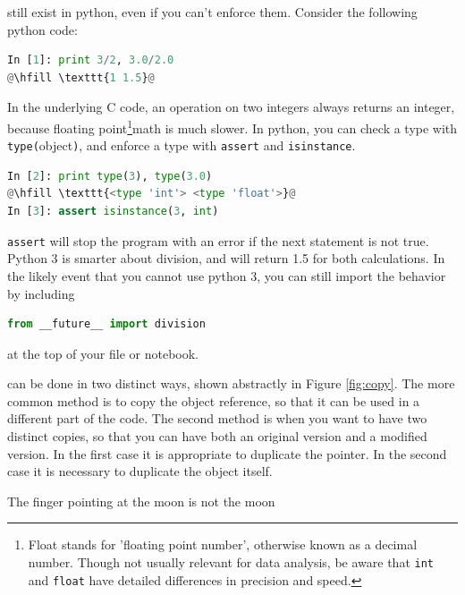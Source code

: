 \documentclass[justified]{tufte-handout}
\newcommand{\floatNote}{\footnote{ Float stands for 'floating
  point number', otherwise known as a decimal number. Though not usually
  relevant for data analysis, be aware that \texttt{int} and \texttt{float} have
  detailed differences in precision and speed.}}
\begin{document}
 still exist in python, even if you can't enforce
them. Consider the following python code:
\begin{adjustwidth}{2.5em}{0pt}
\begin{lstlisting}[language=Python]
In [1]: print 3/2, 3.0/2.0
@\hfill \texttt{1 1.5}@
\end{lstlisting}
\end{adjustwidth}

\noindent
In the underlying C code, an operation on two integers always returns an
integer, because floating point\floatNote \;math is much slower. In python,
you can check a type with \lstinline !type(!object\lstinline !)!, and enforce a
type with \lstinline !assert! and \lstinline !isinstance!.
\begin{adjustwidth}{2.5em}{0pt}
\begin{lstlisting}[language=Python]
In [2]: print type(3), type(3.0)
@\hfill \texttt{<type 'int'> <type 'float'>}@
In [3]: assert isinstance(3, int)
\end{lstlisting}
\end{adjustwidth}
\lstinline !assert! will stop the program with an error if the next statement is
not true. Python 3 is smarter about division, and will return 1.5 for both
calculations. In the likely event that you cannot use python 3, you can still
import the behavior by including
\begin{adjustwidth}{2.5em}{0pt}
\begin{lstlisting}[language=Python]
from __future__ import division
\end{lstlisting}
\end{adjustwidth}
at the top of your file or notebook.

 can be done in two distinct ways, shown abstractly
in Figure \ref*{fig:copy}. The more common method is to copy the object
reference, so that it can be used in a different part of the code. The second
method is when you want to have two distinct copies, so that you can have both
an original version and a modified version. In the first case it is appropriate
to duplicate the pointer. In the second case it is necessary to duplicate the
object itself.


\smallskip
\begin{marginfigure}
    \vspace*{\fill}
    \centering
    \subfloat[Case 1]{\scalebox{1}{}}
    
    \vfill
    
    \subfloat[Case 2]{\scalebox{0.69}{}}
  \caption{The finger pointing at the moon is not the moon}
  \label{fig:copy}
\end{marginfigure}
\end{document}
